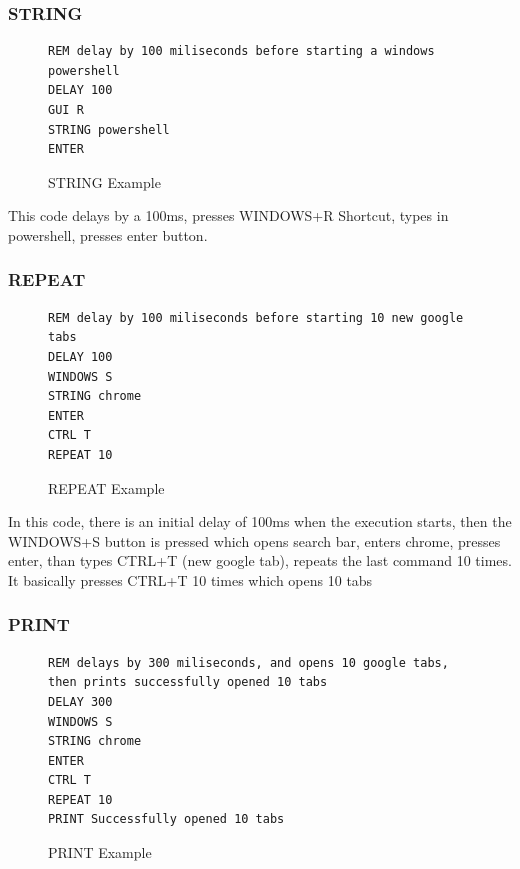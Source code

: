 \documentclass[a4paper,12pt]{article}
\begin{document}
\newpage

\subsubsection{STRING}

\begin{figure}[htb]
\begin{small}
\begin{lstlisting}[language=Ducky]
REM delay by 100 miliseconds before starting a windows powershell
DELAY 100
GUI R
STRING powershell
ENTER
\end{lstlisting}
\end{small}
\caption{STRING Example}
\end{figure}

This code delays by a 100ms, presses WINDOWS+R Shortcut, types in powershell, presses enter button.

\subsubsection{REPEAT}

\begin{figure}[htb]
\begin{small}
\begin{lstlisting}[language=Ducky]
REM delay by 100 miliseconds before starting 10 new google tabs
DELAY 100
WINDOWS S
STRING chrome
ENTER
CTRL T
REPEAT 10
\end{lstlisting}
\end{small}
\caption{REPEAT Example}
\end{figure}

In this code, there is an initial delay of 100ms when the execution starts, then the WINDOWS+S button is pressed which opens search bar, enters chrome, presses enter, than types CTRL+T (new google tab), repeats the last command 10 times. It basically presses CTRL+T 10 times which opens 10 tabs

\newpage

\subsubsection{PRINT}

\begin{figure}[htb]
\begin{small}
\begin{lstlisting}[language=Ducky]
REM delays by 300 miliseconds, and opens 10 google tabs, then prints successfully opened 10 tabs
DELAY 300
WINDOWS S
STRING chrome
ENTER
CTRL T
REPEAT 10
PRINT Successfully opened 10 tabs
\end{lstlisting}
\end{small}
\caption{PRINT Example}
\end{figure}
\end{document}
